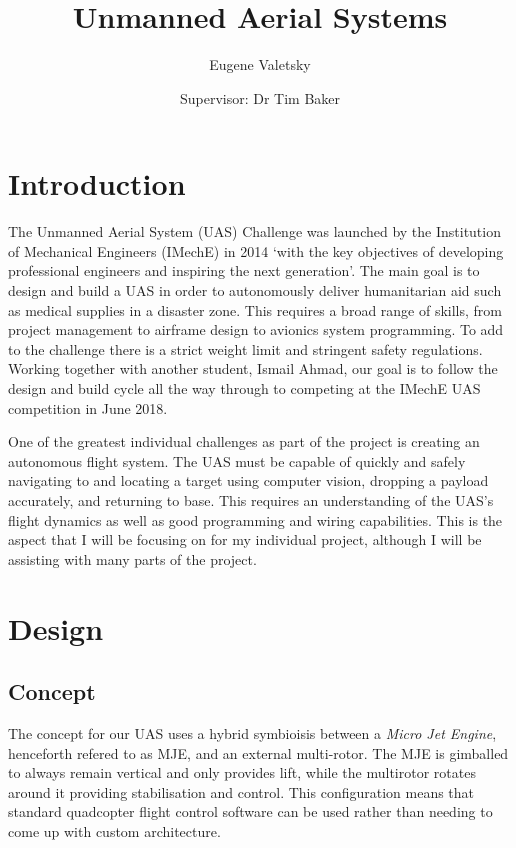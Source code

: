 \documentclass[10pt]{article}
\author{Eugene Valetsky\\ \and Supervisor: Dr Tim Baker}
\title{Unmanned Aerial Systems}
\begin{document}
\maketitle
\tableofcontents
\newpage

\section{Introduction}
The Unmanned Aerial System (UAS) Challenge was launched by the Institution of Mechanical Engineers (IMechE) in 2014 `with the key objectives of developing professional engineers and inspiring the next generation'\cite{IMechE_about_uas}. The main goal is to design and build a UAS in order to autonomously deliver humanitarian aid such as medical supplies in a disaster zone. This requires a broad range of skills, from project management to airframe design to avionics system programming. To add to the challenge there is a strict weight limit and stringent safety regulations. Working together with another student, Ismail Ahmad, our goal is to follow the design and build cycle all the way through to competing at the IMechE UAS competition in June 2018.

One of the greatest individual challenges as part of the project is creating an autonomous flight system. The UAS must be capable of quickly and safely navigating to and locating a target using computer vision, dropping a payload accurately, and returning to base. This requires an understanding of the UAS’s flight dynamics as well as good programming and wiring capabilities. This is the aspect that I will be focusing on for my individual project, although I will be assisting with many parts of the project.

\section{Design}
\subsection{Concept}
The concept for our UAS uses a hybrid symbioisis between a \emph{Micro Jet Engine}, henceforth refered to as MJE, and an external multi-rotor. The MJE is gimballed to always remain vertical and only provides lift, while the multirotor rotates around it providing stabilisation and control. This configuration means that standard quadcopter flight control software can be used rather than needing to come up with custom architecture.
\end{document}
